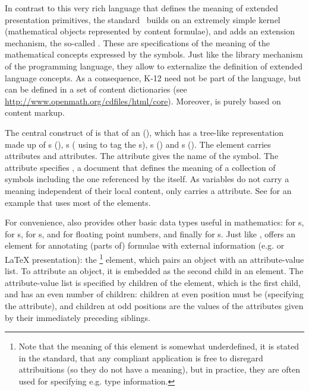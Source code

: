 In contrast to this very rich language that defines the meaning of extended
presentation primitives, the {\openmath} standard~\cite{CapCoh:doms98} builds on
an extremely simple kernel (mathematical objects represented by content formulae),
and adds an extension mechanism, the so-called {}. These are
{} specifications of the meaning of the mathematical
concepts expressed by the {\openmath} symbols.  Just like the library mechanism of
the {} programming language, they allow to externalize the definition of
extended language concepts. As a consequence, K-12 need not be part of the
{\openmath} language, but can be defined in a set of content dictionaries (see
{\url{http://www.openmath.org/cdfiles/html/core}}). Moreover, {\openmath} is
purely based on content markup.

The central construct of {\openmath} is that of an {} ({}), which has a tree-like
representation made up of {s} ({}),
{s} ({} using {} to tag the
{s}), {s}
({}) and {s} ({}). The {}
element carries attributes {} and {}
attributes.  The {} attribute gives the name of the symbol.
The {} attribute specifies {}, a
document that defines the meaning of a collection of symbols including the one
referenced by the {} itself. As variables do not carry a meaning
independent of their local content, {} only carries a
{} attribute. See {} for an
example that uses most of the elements.

For convenience, {\openmath} also provides other basic data types useful in
mathematics: {} for {s}, {} for
{s}, {} for {s}, and {}
for floating point numbers, and finally {} for {s}.  Just
like {\mathml}, {\openmath} offers an element for annotating (parts of) formulae
with external information (e.g. {\mathml} or {\LaTeX} presentation): the
{}\footnote{Note that the meaning of this element is somewhat
  underdefined, it is stated in the standard, that any {\openmath} compliant
  application is free to disregard attribuitions (so they do not have a meaning),
  but in practice, they are often used for specifying e.g.  type information.}
element, which pairs an {\openmath} object with an attribute-value list. To
attribute an {\openmath} object, it is embedded as the second child in an
{} element. The attribute-value list is specified by children of
the {} element, which is the first child, and has an even number of
children: children at even position must be {} (specifying the
attribute), and children at odd positions are the values of the attributes given
by their immediately preceding siblings.

